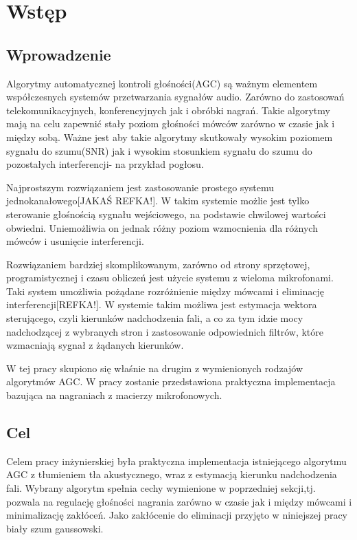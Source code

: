 \chapter{Wstęp}
\section{Wprowadzenie}

Algorytmy automatycznej kontroli głośności(AGC) są ważnym elementem współczesnych systemów przetwarzania sygnałów audio. Zarówno do zastosowań telekomunikacyjnych, konferencyjnych jak i obróbki nagrań. Takie algorytmy mają na celu zapewnić stały poziom głośności mówców zarówno w czasie jak i między sobą.
Ważne jest aby takie algorytmy skutkowały wysokim poziomem sygnału do szumu(SNR) jak i wysokim stosunkiem sygnału do szumu do pozostałych interferencji- na przykład pogłosu.

Najprostszym rozwiązaniem jest zastosowanie prostego systemu jednokanałowego[JAKAŚ REFKA!]. W takim systemie możlie jest tylko sterowanie głośnością sygnału wejściowego, na podstawie chwilowej wartości obwiedni. Uniemożliwia on jednak różny poziom wzmocnienia dla różnych mówców i usunięcie interferencji.

Rozwiązaniem bardziej skomplikowanym, zarówno od strony sprzętowej, programistycznej i czasu obliczeń jest użycie systemu z wieloma mikrofonami. Taki system umożliwia pożądane rozróżnienie między mówcami i eliminację interferencji[REFKA!]. W systemie takim możliwa jest estymacja wektora sterującego, czyli kierunków nadchodzenia fali, a co za tym idzie mocy nadchodzącej z wybranych stron i zastosowanie odpowiednich filtrów, które wzmacniają sygnał z żądanych kierunków.

W tej pracy skupiono się właśnie na drugim z wymienionych rodzajów algorytmów AGC. W pracy zostanie przedstawiona praktyczna implementacja bazująca na nagraniach z macierzy mikrofonowych.

\section{Cel}
Celem pracy inżynierskiej była praktyczna implementacja istniejącego algorytmu AGC z tłumieniem tła akustycznego, wraz z estymacją kierunku nadchodzenia fali. Wybrany algorytm spełnia cechy wymienione w poprzedniej sekcji,tj. pozwala na regulację głośności nagrania zarówno w czasie jak i między mówcami i minimalizację zakłóceń. Jako zakłócenie do eliminacji przyjęto w niniejszej pracy biały szum gaussowski.

